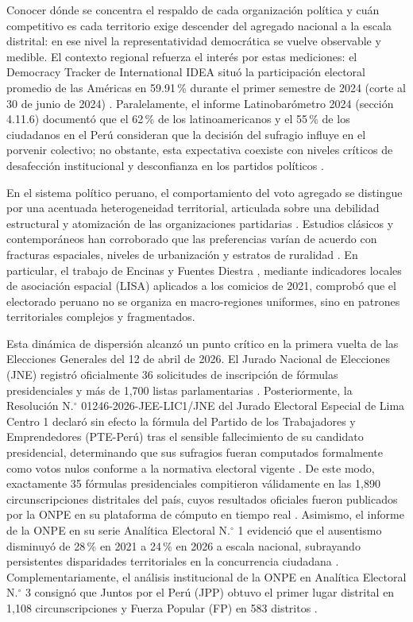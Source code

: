 \documentclass[conference,10pt,letterpaper]{IEEEtran}
\begin{document}
Conocer dónde se concentra el respaldo de cada organización política y cuán competitivo es cada territorio exige descender del agregado nacional a la escala distrital: en ese nivel la representatividad democrática se vuelve observable y medible. El contexto regional refuerza el interés por estas mediciones: el Democracy Tracker de International IDEA situó la participación electoral promedio de las Américas en 59.91\,\% durante el primer semestre de 2024 (corte al 30 de junio de 2024) \cite{idea2024}. Paralelamente, el informe Latinobarómetro 2024 (sección 4.11.6) documentó que el 62\,\% de los latinoamericanos y el 55\,\% de los ciudadanos en el Perú consideran que la decisión del sufragio influye en el porvenir colectivo; no obstante, esta expectativa coexiste con niveles críticos de desafección institucional y desconfianza en los partidos políticos \cite{latinobarometro2024}.

En el sistema político peruano, el comportamiento del voto agregado se distingue por una acentuada heterogeneidad territorial, articulada sobre una debilidad estructural y atomización de las organizaciones partidarias \cite{sulmont2018, levitsky2003}. Estudios clásicos y contemporáneos han corroborado que las preferencias varían de acuerdo con fracturas espaciales, niveles de urbanización y estratos de ruralidad \cite{quintanilla2020, carranza2022}. En particular, el trabajo de Encinas y Fuentes Diestra \cite{encinas2021}, mediante indicadores locales de asociación espacial (LISA) aplicados a los comicios de 2021, comprobó que el electorado peruano no se organiza en macro-regiones uniformes, sino en patrones territoriales complejos y fragmentados.

Esta dinámica de dispersión alcanzó un punto crítico en la primera vuelta de las Elecciones Generales del 12 de abril de 2026. El Jurado Nacional de Elecciones (JNE) registró oficialmente 36 solicitudes de inscripción de fórmulas presidenciales y más de 1,700 listas parlamentarias \cite{jne2025_inscripcion, jne2026_compendio}. Posteriormente, la Resolución N.$^\circ$ 01246-2026-JEE-LIC1/JNE del Jurado Electoral Especial de Lima Centro 1 declaró sin efecto la fórmula del Partido de los Trabajadores y Emprendedores (PTE-Perú) tras el sensible fallecimiento de su candidato presidencial, determinando que sus sufragios fueran computados formalmente como votos nulos conforme a la normativa electoral vigente \cite{jee2026_pte}. De este modo, exactamente 35 fórmulas presidenciales compitieron válidamente en las 1,890 circunscripciones distritales del país, cuyos resultados oficiales fueron publicados por la ONPE en su plataforma de cómputo en tiempo real \cite{onpe2026_resultados_web}. Asimismo, el informe de la ONPE en su serie Analítica Electoral N.$^\circ$ 1 evidenció que el ausentismo disminuyó de 28\,\% en 2021 a 24\,\% en 2026 a escala nacional, subrayando persistentes disparidades territoriales en la concurrencia ciudadana \cite{onpe2026_analitica1}. Complementariamente, el análisis institucional de la ONPE en Analítica Electoral N.$^\circ$ 3 consignó que Juntos por el Perú (JPP) obtuvo el primer lugar distrital en 1,108 circunscripciones y Fuerza Popular (FP) en 583 distritos \cite{onpe2026_noticia1427006}.
\end{document}
